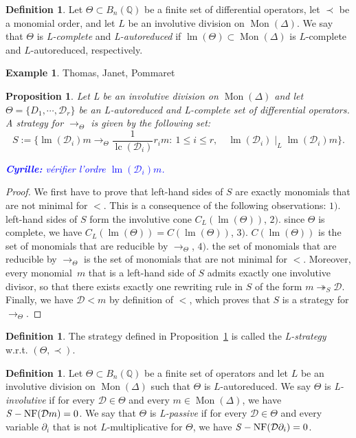 \documentclass[10pt]{easychair}
\newtheorem{proposition}[theorem]{Proposition}
\theoremstyle{definition}
\newtheorem{definition}[theorem]{Definition}
\newtheorem{example}[theorem]{Example}
\newcommand\fixmecc[1]{{\textcolor{blue}{{\bf Cyrille:} #1}}}
\newcommand\D{\mathcal{D}}
\DeclareMathOperator{\lm}{lm}
\DeclareMathOperator{\lc}{lc}
\newcommand\Q{\mathbb{Q}}
\newcommand\Weyl[1]{B_{#1}(\Q)}
\DeclareMathOperator{\Mon}{Mon}
\newcommand\rewS{\twoheadrightarrow_S}
\newcommand\rewTheta{\to_{\Theta}}
\newcommand\divInv[1]{\mid_{#1}}
\DeclareMathOperator{\SNF}{{\it S}-NF}
\begin{document}
\begin{definition}
  Let $\Theta\subset\Weyl{n}$ be a finite set of differential operators,
  let $\prec$ be a monomial order, and let $L$ be an involutive division
  on $\Mon(\Delta)$. We say that $\Theta$ is {\em L-complete} and
  {\em L-autoreduced} if $\lm(\Theta)\subset\Mon(\Delta)$ is $L$-complete
  and $L$-autoreduced, respectively.
\end{definition}

\begin{example}
  Thomas, Janet, Pommaret
\end{example}

\begin{proposition}\label{prop:involutive_strategy}
  Let L be an involutive division on $\Mon(\Delta)$ and let
  $\Theta=\{D_1,\cdots,\D_r\}$ be an L-autoreduced and L-complete set of
  differential operators. A strategy for $\rewTheta$ is given by the
  following set:
  \[S:=\{\lm(\D_i)m\rewTheta\frac{1}{\lc(\D_i)}r_im:\ 1\leq i\leq r,
  \quad\lm(\D_i)\divInv{L}\lm(\D_i)m\}.\]
    
  \fixmecc{vérifier l'ordre $\lm(\D_i)m$.}
\end{proposition}

\begin{proof}
  We first have to prove that left-hand sides of $S$ are exactly
  monomials that are not minimal for $<$. This is a consequence of the
  following observations: $1).$ left-hand sides of $S$ form the
  involutive cone $C_L(\lm(\Theta))$, $2).$ since $\Theta$ is complete,
  we have $C_L(\lm(\Theta))=C(\lm(\Theta))$, $3).$ $C(\lm(\Theta))$ is
  the set of monomials that are reducible by $\rewTheta$, $4).$ the set
  of monomials that are reducible by $\rewTheta$ is the set of monomials
  that are not minimal for $<$. Moreover, every monomial~$m$ that is a
  left-hand side of $S$ admits exactly one involutive divisor, so that
  there exists exactly one rewriting rule in $S$ of the form $m\rewS\D$.
  Finally, we have $\D<m$ by definition of $<$, which proves that $S$ is
  a strategy for $\rewTheta$.
\end{proof}

\begin{definition}
  The strategy defined in Proposition~\ref{prop:involutive_strategy} is
  called the {\em L-strategy} w.r.t. $(\Theta,\prec)$.
\end{definition}

\begin{definition}
  Let $\Theta\subset\Weyl{n}$ be a finite set of operators and let $L$ be
  an involutive division on $\Mon(\Delta)$ such that $\Theta$ is
  $L$-autoreduced. We say $\Theta$ is {\em L-involutive} if for every
  $\D\in\Theta$ and every $m\in\Mon(\Delta)$, we have $\SNF(\D m)=0$. We
  say that $\Theta$ is {\em  L-passive} if for every $\D\in\Theta$ and
  every variable $\partial_i$ that is not $L$-multiplicative for
  $\Theta$, we have $\SNF(\D\partial_i)=0$.
\end{definition}
\end{document}
